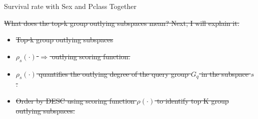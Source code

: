 \documentclass[
 size=14pt,
 paper=smartboard,  %
 mode=present, 		%
 display=slides, 	%
 style=tuliplab,  	%
 pauseslide,
 fleqn,leqno]{powerdot}
\providecommand{\DIFdeltex}[1]{{\protect\color{red}\sout{#1}}}                      %
\providecommand{\DIFdelFL}[1]{\DIFdel{#1}} %
\providecommand{\DIFdel}[1]{\texorpdfstring{\DIFdeltex{#1}}{}} %
\begin{document}
\begin{slide}[toc=,bm=]{Survival rate with Sex and Pclass Together}
\begin{table}[tb]
\DIFdelFL{What does the top-k group outlying subspaces mean?
Next, I will explain it.
}%


\begin{itemize}%
\item%
\DIFdelFL{Top-k group outlying subspaces
}%

\item%
\DIFdelFL{$\rho_s(\cdot)$ $\Rightarrow$ outlying scoring function.
}%

\item%
\DIFdelFL{$\rho_s(\cdot)$ quantifies the outlying degree of the
query group $G_q$ in the subspace $s$.
}%

\item%
\DIFdelFL{Order by DESC using scoring function $\rho(\cdot)$
to identify top K group outlying subspaces.
}
\end{itemize}%


\end{table}
\end{slide}
\end{document}
